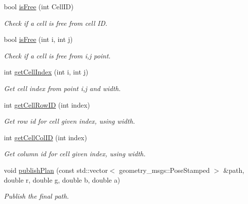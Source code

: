 \begin{DoxyCompactItemize}
bool \hyperlink{classRAstar__planner_1_1RAstarPlannerROS_a2993e43fb09446c21df27735986e13c1}{is\-Free} (int Cell\-I\-D)
\begin{DoxyCompactList}\small\item\em Check if a cell is free from cell I\-D. \end{DoxyCompactList}\item 
bool \hyperlink{classRAstar__planner_1_1RAstarPlannerROS_a1648d66652edcba3b73284af7f5b7c18}{is\-Free} (int i, int j)
\begin{DoxyCompactList}\small\item\em Check if a cell is free from i,j point. \end{DoxyCompactList}\item 
int \hyperlink{classRAstar__planner_1_1RAstarPlannerROS_ade7b3d65aa5e97588a58e968852cc279}{get\-Cell\-Index} (int i, int j)
\begin{DoxyCompactList}\small\item\em Get cell index from point i,j and width. \end{DoxyCompactList}\item 
int \hyperlink{classRAstar__planner_1_1RAstarPlannerROS_af17757b32cb946011d64fa9478395bdf}{get\-Cell\-Row\-I\-D} (int index)
\begin{DoxyCompactList}\small\item\em Get row id for cell given index, using width. \end{DoxyCompactList}\item 
int \hyperlink{classRAstar__planner_1_1RAstarPlannerROS_ae6ea4452952f573c9554b9680c2e9d3d}{get\-Cell\-Col\-I\-D} (int index)
\begin{DoxyCompactList}\small\item\em Get column id for cell given index, using width. \end{DoxyCompactList}\item 
void \hyperlink{classRAstar__planner_1_1RAstarPlannerROS_a0ea613cb0c57682fd0ce840bbf5ed1d5}{publish\-Plan} (const std\-::vector$<$ geometry\-\_\-msgs\-::\-Pose\-Stamped $>$ \&path, double r, double g, double b, double a)
\begin{DoxyCompactList}\small\item\em Publish the final path. \end{DoxyCompactList}\end{DoxyCompactItemize}
